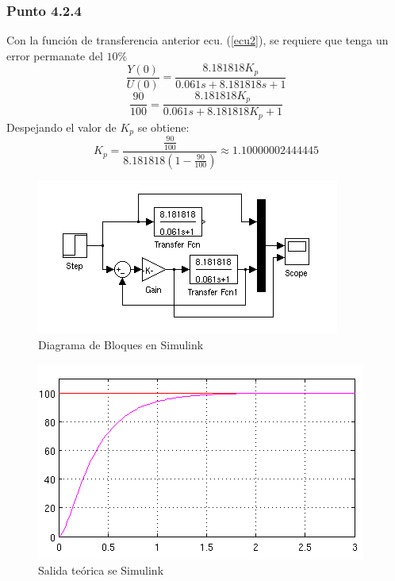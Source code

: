 \documentclass[twocolumn]{IEEEtran}
\begin{document}
\subsubsection{Punto 4.2.4}
\noindent
Con la función de transferencia anterior ecu. (\ref{ecu2}), se requiere que tenga un error permanate del $10\%$
\begin{equation*}
 \frac{{Y\left( 0 \right)}}{{U\left( 0 \right)}} = \frac{{8.181818K_p }}{{0.061s + 8.181818s + 1}}
\end{equation*}
\begin{equation*}
\frac{{90}}{{100}} = \frac{{8.181818K_p }}{{0.061s + 8.181818K_p  + 1}} 
\end{equation*}
\noindent
Despejando el valor de $K_p$ se obtiene:
\begin{equation*}
 K_p  = \frac{{\frac{{90}}{{100}}}}{{8.181818\left( {1 - \frac{{90}}{{100}}} \right)}}\approx 1.10000002444445
\end{equation*}
\begin{figure}[H]
	\centering
		\includegraphics[scale=1]{figure1.png}
	\caption{Diagrama de Bloques en Simulink}
	\label{fig3}
\end{figure}
\begin{figure}[H]
	\centering
		\includegraphics[scale=0.85]{salida2.png}
	\caption{Salida teórica se Simulink}
	\label{fig4}
\end{figure}
\end{document}
